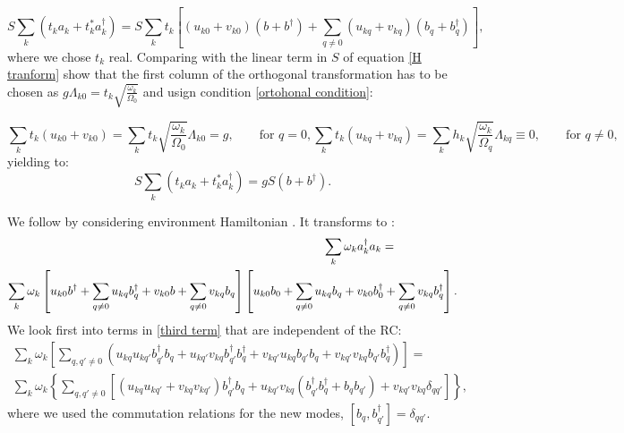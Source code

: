 \documentclass[%
preprint,
onecolumn,
notitlepag,
 amsmath,amssymb,
 aps,
 pra,
]{revtex4-2}
\begin{document}
\begin{equation}
    S \sum_k \left( t_k a_k + t_k ^*a_k^{\dagger} \right) =  S \sum_k t_{k} \left[ (u_{k0} + v_{k0}) (b + b^{\dagger}) +\sum_{q\neq 0} (u_{kq} + v_{kq}) (b_{q} + b_{q}^{\dagger}) \right],
\end{equation}
where we chose $t_{k}$ real. Comparing with the linear term in $S$ of equation \eqref{H tranform}
 show that the first column of the orthogonal transformation has to be chosen as $ g \Lambda_{k 0}=t_{k} \sqrt{\frac{\omega_{k}}{\Omega_{0}}}$ and usign condition \eqref{ortohonal condition}:   


\begin{subequations}
\begin{equation}
    \sum_{k} t_{k} (u_{k0} + v_{k0}) = \sum_{k} t_{k} \sqrt{\frac{\omega_{k}}{\Omega_{0}}} \Lambda_{k0} =  g, \qquad \text{for } q=0,
\end{equation}
\begin{equation}
    \sum_{k} t_{k} (u_{kq} + v_{kq}) = \sum_{k} h_{k} \sqrt{\frac{\omega_{k}}{\Omega_{q}}} \Lambda_{kq} \equiv 0, \qquad \text{for } q\neq 0,
\end{equation}
\end{subequations}
yielding  to: 
\begin{equation}
    S \sum_k \left( t_k a_k + t_k ^*a_k^{\dagger} \right) = g  S  (b + b^{\dagger}).
\end{equation}







We follow by considering environment Hamiltonian . It transforms to : 
\begin{multline}
\hspace{7.5cm} \sum_k \omega_k a_k^{\dagger} a_k  =\\
\sum_k \omega_k  \left[ u_{k0} b^{\dagger} +\sum_{q\neq 0} u_{kq} b_q^{\dagger} + v_{k0} b+ \sum_{q\neq 0} v_{kq} b_q \right] \left[ u_{k0} b_0 +\sum_{q\neq 0} u_{kq} b_q + v_{k0} b_0^{\dagger}+ \sum_{q\neq 0} v_{kq} b_q^{\dagger} \right].
\label{third term}
\end{multline}
We look first into terms in \eqref{third term} that are independent of the RC:
\begin{multline}
\sum_{k} \omega_{k} \left[\sum_{q,q' \neq 0} \left( u_{kq } u_{kq' }  b_{q'}^{\dagger} b_q + u_{kq' } v_{kq }  b_{q'}^{\dagger} b_q^{\dagger}  + v_{kq' } u_{kq }  b_{q'} b_q + v_{kq' } v_{kq }  b_{q'} b_q ^{\dagger}\right) \right] = \\  \sum_{k} \omega_{k} \left\{ \sum_{q,q' \neq 0}  \left[    \left(  u_{kq } u_{kq' }+ v_{kq } v_{kq' }  \right) b_{q'}^{\dagger} b_q +  u_{kq'} v_{kq} \left(  b_{q'}^{\dagger} b_q^{\dagger}  +  b_q b_{q'}  \right) + v_{kq'} v_{kq} \delta_{qq'} \right] \right\},
\label{terms wihtout rc}
\end{multline}
where we used the commutation relations for the new modes, $[b_q,b_{q'}^{\dagger}] =\delta_{qq'}$. 
\end{document}
